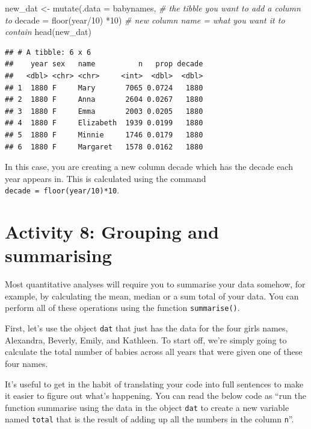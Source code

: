 \documentclass[
  oneside]{book}
\newenvironment{Shaded}{\begin{snugshade}}{\end{snugshade}}
\newcommand{\AttributeTok}[1]{\textcolor[rgb]{0.77,0.63,0.00}{#1}}
\newcommand{\CommentTok}[1]{\textcolor[rgb]{0.56,0.35,0.01}{\textit{#1}}}
\newcommand{\DecValTok}[1]{\textcolor[rgb]{0.00,0.00,0.81}{#1}}
\newcommand{\FunctionTok}[1]{\textcolor[rgb]{0.00,0.00,0.00}{#1}}
\newcommand{\NormalTok}[1]{#1}
\newcommand{\OtherTok}[1]{\textcolor[rgb]{0.56,0.35,0.01}{#1}}
\newcommand{\SpecialCharTok}[1]{\textcolor[rgb]{0.00,0.00,0.00}{#1}}
\begin{document}
\begin{Shaded}
\begin{Highlighting}[]
\NormalTok{new\_dat }\OtherTok{\textless{}{-}} \FunctionTok{mutate}\NormalTok{(}\AttributeTok{.data =}\NormalTok{ babynames, }\CommentTok{\# the tibble you want to add a column to}
                  \AttributeTok{decade =} \FunctionTok{floor}\NormalTok{(year}\SpecialCharTok{/}\DecValTok{10}\NormalTok{) }\SpecialCharTok{*}\DecValTok{10}\NormalTok{) }\CommentTok{\# new column name = what you want it to contain}
\FunctionTok{head}\NormalTok{(new\_dat)}
\end{Highlighting}
\end{Shaded}

\begin{verbatim}
## # A tibble: 6 x 6
##    year sex   name          n   prop decade
##   <dbl> <chr> <chr>     <int>  <dbl>  <dbl>
## 1  1880 F     Mary       7065 0.0724   1880
## 2  1880 F     Anna       2604 0.0267   1880
## 3  1880 F     Emma       2003 0.0205   1880
## 4  1880 F     Elizabeth  1939 0.0199   1880
## 5  1880 F     Minnie     1746 0.0179   1880
## 6  1880 F     Margaret   1578 0.0162   1880
\end{verbatim}

In this case, you are creating a new column decade which has the decade each year appears in. This is calculated using the command \texttt{decade\ =\ floor(year/10)*10}.

\hypertarget{activity-8-grouping-and-summarising}{%
\section{Activity 8: Grouping and summarising}\label{activity-8-grouping-and-summarising}}

Most quantitative analyses will require you to summarise your data somehow, for example, by calculating the mean, median or a sum total of your data. You can perform all of these operations using the function \texttt{summarise()}.

First, let's use the object \texttt{dat} that just has the data for the four girls names, Alexandra, Beverly, Emily, and Kathleen. To start off, we're simply going to calculate the total number of babies across all years that were given one of these four names.

It's useful to get in the habit of translating your code into full sentences to make it easier to figure out what's happening. You can read the below code as ``run the function summarise using the data in the object \texttt{dat} to create a new variable named \texttt{total} that is the result of adding up all the numbers in the column \texttt{n}''.
\end{document}
